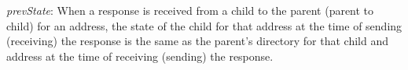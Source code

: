 \begin{inv}
\textit{prevState}: When a response is received from a child to the parent
(parent to child) for an address, the state of the child for that address at
the time of sending (receiving) the response is the same as the parent's
directory for that child and address at the time of receiving (sending) the
response.
\label{prevState}
\end{inv}

%
%
%
